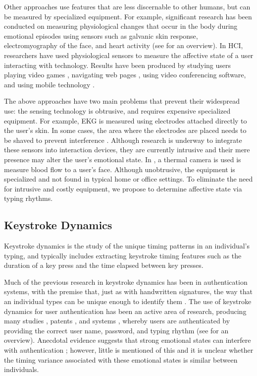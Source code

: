 \begin{flushleft}
Other approaches use features that are less discernable to
other humans, but can be measured by specialized
equipment. For example, significant research has been
conducted on measuring physiological changes that occur
in the body during emotional episodes using sensors such as
galvanic skin response, electromyography of the face, and heart activity (see \cite{fairclough} for an overview). In HCI,
researchers have used physiological sensors to measure the
affective state of a user interacting with technology. Results
have been produced by studying users playing video games \cite{mandryk}, navigating web pages \cite{ward}, using video conferencing
software, and using mobile technology \cite{chen}.

The above approaches have two main problems that prevent
their widespread use: the sensing technology is obtrusive,
and requires expensive specialized equipment. For example,
EKG is measured using electrodes attached directly to the
user’s skin. In some cases, the area where the electrodes are
placed needs to be shaved to prevent interference \cite{stern}.
Although research is underway to integrate these sensors
into interaction devices, they are currently intrusive and
their mere presence may alter the user’s emotional state. In
\cite{khan}, a thermal camera is used is measure blood flow to a
user’s face. Although unobtrusive, the equipment is
specialized and not found in typical home or office settings.
To eliminate the need for intrusive and costly equipment,
we propose to determine affective state via typing rhythms.

\subsection{Keystroke Dynamics}

Keystroke dynamics is the study of the unique timing
patterns in an individual’s typing, and typically includes
extracting keystroke timing features such as the duration of
a key press and the time elapsed between key presses.

Much of the previous research in keystroke dynamics has
been in authentication systems, with the premise that, just
as with handwritten signatures, the way that an individual
types can be unique enough to identify them \cite{joyce}. The use
of keystroke dynamics for user authentication has been an
active area of research, producing many studies
 \cite{bergadano, dowland, joyce, monrose }, patents \cite{bender}, and systems \cite{admit}, whereby users
are authenticated by providing the correct user name,
password, and typing rhythm (see \cite{epp} for an overview).
Anecdotal evidence suggests that strong emotional states
can interfere with authentication \cite{monrose}; however, little is
mentioned of this and it is unclear whether the timing
variance associated with these emotional states is similar
between individuals.



\end{flushleft}
